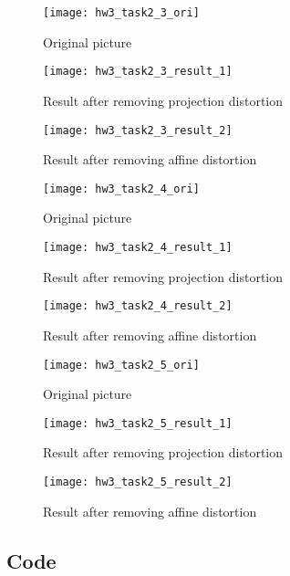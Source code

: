 \documentclass[11pt]{article}
\begin{document}
\begin{figure}[H]
\centering
\texttt{[image: hw3\_task2\_3\_ori]}
\caption{Original picture}
\label{}
\end{figure}

\begin{figure}[H]
\centering
\texttt{[image: hw3\_task2\_3\_result\_1]}
\caption{Result after removing projection distortion}
\label{}
\end{figure}

\begin{figure}[H]
\centering
\texttt{[image: hw3\_task2\_3\_result\_2]}
\caption{Result after removing affine distortion}
\label{}
\end{figure}

\begin{figure}[H]
\centering
\texttt{[image: hw3\_task2\_4\_ori]}
\caption{Original picture}
\label{}
\end{figure}

\begin{figure}[H]
\centering
\texttt{[image: hw3\_task2\_4\_result\_1]}
\caption{Result after removing projection distortion}
\label{}
\end{figure}

\begin{figure}[H]
\centering
\texttt{[image: hw3\_task2\_4\_result\_2]}
\caption{Result after removing affine distortion}
\label{}
\end{figure}

\begin{figure}[H]
\centering
\texttt{[image: hw3\_task2\_5\_ori]}
\caption{Original picture}
\label{}
\end{figure}

\begin{figure}[H]
\centering
\texttt{[image: hw3\_task2\_5\_result\_1]}
\caption{Result after removing projection distortion}
\label{}
\end{figure}

\begin{figure}[H]
\centering
\texttt{[image: hw3\_task2\_5\_result\_2]}
\caption{Result after removing affine distortion}
\label{}
\end{figure}


\subsection*{Code}
\end{document}
